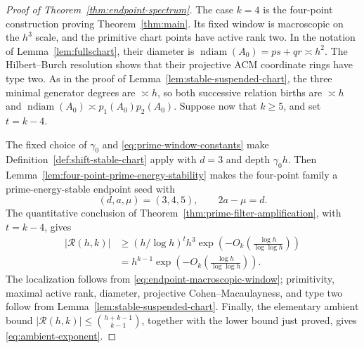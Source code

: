 \documentclass[11pt,reqno]{amsart}
\theoremstyle{definition}
\theoremstyle{remark}
\newcommand{\Rcal}{\mathcal R}
\newcommand{\ndiam}{\operatorname{ndiam}}
\begin{document}
\begin{proof}[Proof of Theorem~\ref{thm:endpoint-spectrum}]
The case $k=4$ is the four-point construction proving
Theorem~\ref{thm:main}.  Its fixed window is macroscopic on the $h^3$
scale, and the primitive chart points have active rank two.  In the notation
of Lemma~\ref{lem:fullschart}, their diameter is
$\ndiam(A_0)=ps+qr\asymp h^2$.  The Hilbert--Burch resolution shows that their
projective ACM coordinate rings have type two.  As in the proof of
Lemma~\ref{lem:stable-suspended-chart}, the three minimal generator degrees
are $\asymp h$, so both successive relation births are $\asymp h$ and
$\ndiam(A_0)\asymp p_1(A_0)p_2(A_0)$.  Suppose now that $k\geq5$,
and set $t=k-4$.

The fixed choice of $\gamma_0$ and \eqref{eq:prime-window-constants} make
Definition~\ref{def:shift-stable-chart} apply with $d=3$ and depth
$\gamma_0h$.  Then
Lemma~\ref{lem:four-point-prime-energy-stability} makes the four-point family
a prime-energy-stable endpoint seed with
\begin{equation}\label{eq:four-point-endpoint-triple}
 (d,a,\mu)=(3,4,5),\qquad 2a-\mu=d.
\end{equation}
The quantitative conclusion of
Theorem~\ref{thm:prime-filter-amplification}, with $t=k-4$, gives
\begin{align*}
 |\Rcal(h,k)|
 &\geq
 (h/\log h)^t h^3
 \exp\!\left(-O_k\!\left(
  \frac{\log h}{\log\log h}\right)\right)\\
 &=h^{k-1}
 \exp\!\left(-O_k\!\left(
   \frac{\log h}{\log\log h}\right)\right).
\end{align*}
The localization follows from \eqref{eq:endpoint-macroscopic-window};
primitivity, maximal active rank, diameter, projective
Cohen--Macaulayness, and type two follow from
Lemma~\ref{lem:stable-suspended-chart}.
Finally, the elementary ambient bound
$|\Rcal(h,k)|\leq\binom{h+k-1}{k-1}$, together with the lower bound just
proved, gives \eqref{eq:ambient-exponent}.
\end{proof}
\end{document}
